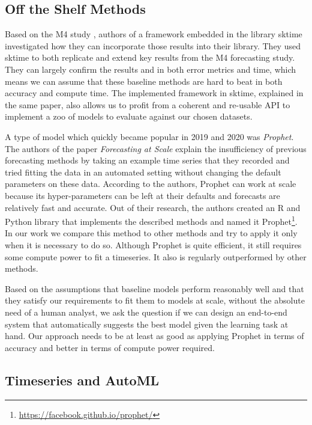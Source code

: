 \subsection{Off the Shelf Methods}

Based on the M4 study \cite{M4}, authors of a framework embedded in the library sktime investigated how they can incorporate those results into their library. They used sktime to both replicate and extend key results from the M4 forecasting study. They can largely confirm the results and in both error metrics and time, which means we can assume that these baseline methods are hard to beat in both accuracy and compute time. The implemented framework in sktime, explained in the same paper, also allows us to profit from a coherent and re-usable API to implement a zoo of models to evaluate against our chosen datasets.

A type of model which quickly became popular in 2019 and 2020 was \emph{Prophet}. The authors of the paper \emph{Forecasting at Scale} \cite{prophet} explain the insufficiency of previous forecasting methods by taking an example time series that they recorded and tried fitting the data in an automated setting without changing the default parameters on these data. According to the authors, Prophet can work at scale because its hyper-parameters can be left at their defaults and forecasts are relatively fast and accurate. Out of their research, the authors created an R and Python library that implements the described methods and named it Prophet\footnote{\href{https://facebook.github.io/prophet/}{https://facebook.github.io/prophet/}}. In our work we compare this method to other methods and try to apply it only when it is necessary to do so. Although Prophet is quite efficient, it still requires some compute power to fit a timeseries. It also is regularly outperformed by other methods.

Based on the assumptions that baseline models perform reasonably well and that they satisfy our requirements to fit them to models at scale, without the absolute need of a human analyst, we ask the question if we can design an end-to-end system that automatically suggests the best model given the learning task at hand. Our approach needs to be at least as good as applying Prophet in terms of accuracy and better in terms of compute power required. 



\subsection{Timeseries and AutoML}

